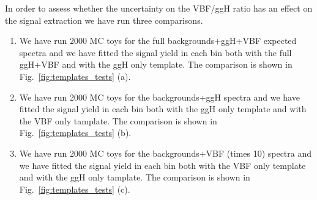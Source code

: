 In order to assess whether the uncertainty on the VBF/ggH ratio has an effect on the signal extraction we have run three comparisons.
\begin{enumerate}
\item We have run 2000 MC toys for the full backgrounds+ggH+VBF expected spectra and we have fitted the signal yield in each bin both with the full ggH+VBF and with the ggH only template. The comparison is shown in Fig.~\ref{fig:templates_tests} (a).
\item We have run 2000 MC toys for the backgrounds+ggH spectra and we have fitted the signal yield in each bin both with the ggH only template and with the VBF only tamplate. The comparison is shown in Fig.~\ref{fig:templates_tests} (b).
\item We have run 2000 MC toys for the backgrounds+VBF (times 10) spectra and we have fitted the signal yield in each bin both with the VBF only template and with the ggH only tamplate. The comparison is shown in Fig.~\ref{fig:templates_tests} (c).
\end{enumerate}
